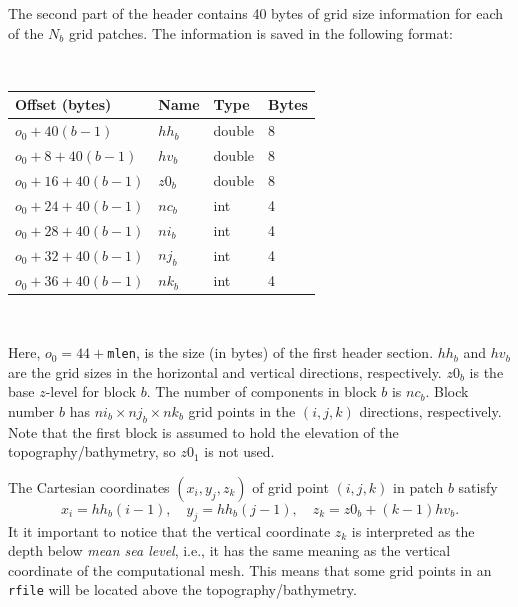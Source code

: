 \documentclass[11pt]{report}
\begin{document}
{The second part of the header contains 40 bytes of grid size information for each of the $N_b$ grid
patches. The information is saved in the following format:
\begin{center}
	\hspace{-35mm}{\tt for ($b=1$; $b\leq N_b$; $b$++) }\nopagebreak \\
	\vspace{2mm}
	\begin{tabular}{llll}\hline
		Offset (bytes)         & Name     & Type   & Bytes \\ \hline
		$o_0 + 40(b - 1)$      & $hh_{b}$ & double & 8     \\ \hline
		$o_0 + 8 + 40(b - 1)$  & $hv_{b}$ & double & 8     \\ \hline
		$o_0 + 16 + 40(b - 1)$ & $z0_{b}$ & double & 8     \\ \hline
		$o_0 + 24 + 40(b - 1)$ & $nc_{b}$ & int    & 4     \\ \hline
		$o_0 + 28 + 40(b - 1)$ & $ni_{b}$ & int    & 4     \\ \hline
		$o_0 + 32 + 40(b - 1)$ & $nj_{b}$ & int    & 4     \\ \hline
		$o_0 + 36 + 40(b - 1)$ & $nk_{b}$ & int    & 4     \\ \hline
	\end{tabular}\\
\end{center}
Here, $o_0=44+${\tt mlen}, is the size (in bytes) of the first header section. $hh_b$ and $hv_b$ are
the grid sizes in the horizontal and vertical directions, respectively. $z0_b$ is the base $z$-level
for block $b$. The number of components in block $b$ is $nc_b$. Block number $b$ has $ni_b\times
	nj_b\times nk_b$ grid points in the $(i,j,k)$ directions, respectively. Note that the first block is
assumed to hold the elevation of the topography/bathymetry, so $z0_1$ is not used.

The Cartesian coordinates $(x_i, y_j, z_k)$ of grid point $(i,j,k)$ in patch $b$ satisfy
\[
	x_i = hh_b(i-1),\quad y_j = hh_b(j-1),\quad z_k = z0_b + (k-1)hv_b.
\]
It it important to notice that the vertical coordinate $z_k$ is interpreted as the depth below {\em
		mean sea level}, i.e., it has the same meaning as the vertical coordinate of the computational
mesh. This means that some grid points in an {\tt rfile} will be located above the topography/bathymetry.

}
\end{document}
